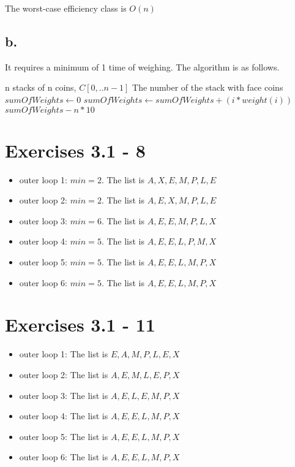 \documentclass{article}
\begin{document}
The worst-case efficiency class is $O(n)$

\subsection*{b.}

It requires a minimum of 1 time of weighing. The algorithm is as follows.

\begin{center}
\begin{algorithmic}
\INPUT
n stacks of n coins, $C[0,..n-1]$
\OUTPUT
The number of the stack with face coins
\State $sumOfWeights \leftarrow 0$
\State $sumOfWeights \leftarrow sumOfWeights + (i*weight(i))$
\EndFor
\State \Return $sumOfWeights - n*10$
\end{algorithmic}
\end{center}

\section{Exercises 3.1 - 8}

\begin{itemize}
\item outer loop 1: $min=2$. The list is $A,X,E,M,P,L,E$
\item outer loop 2: $min=2$. The list is $A,E,X,M,P,L,E$
\item outer loop 3: $min=6$. The list is $A,E,E,M,P,L,X$
\item outer loop 4: $min=5$. The list is $A,E,E,L,P,M,X$
\item outer loop 5: $min=5$. The list is $A,E,E,L,M,P,X$
\item outer loop 6: $min=5$. The list is $A,E,E,L,M,P,X$
\end{itemize}

\section{Exercises 3.1 - 11}

\begin{itemize}
\item outer loop 1: The list is $E,A,M,P,L,E,X$
\item outer loop 2: The list is $A,E,M,L,E,P,X$
\item outer loop 3: The list is $A,E,L,E,M,P,X$
\item outer loop 4: The list is $A,E,E,L,M,P,X$
\item outer loop 5: The list is $A,E,E,L,M,P,X$
\item outer loop 6: The list is $A,E,E,L,M,P,X$
\end{itemize}
\end{document}
